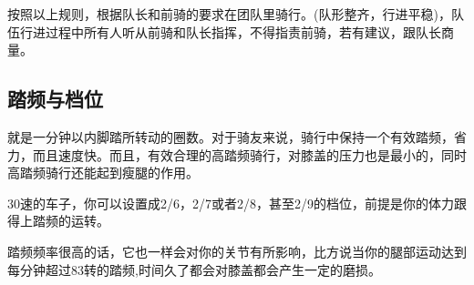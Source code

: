 \documentclass{ctexbook}
\begin{document}
按照以上规则，根据队长和前骑的要求在团队里骑行。(队形整齐，行进平稳)，队伍行进过程中所有人听从前骑和队长指挥，不得指责前骑，若有建议，跟队长商量。

\subsection{踏频与档位}

就是一分钟以内脚踏所转动的圈数。对于骑友来说，骑行中保持一个有效踏频，省力，而且速度快。而且，有效合理的高踏频骑行，对膝盖的压力也是最小的，同时高踏频骑行还能起到瘦腿的作用。

30速的车子，你可以设置成2/6，2/7或者2/8，甚至2/9的档位，前提是你的体力跟得上踏频的运转。

踏频频率很高的话，它也一样会对你的关节有所影响，比方说当你的腿部运动达到每分钟超过83转的踏频,时间久了都会对膝盖都会产生一定的磨损。
\end{document}
